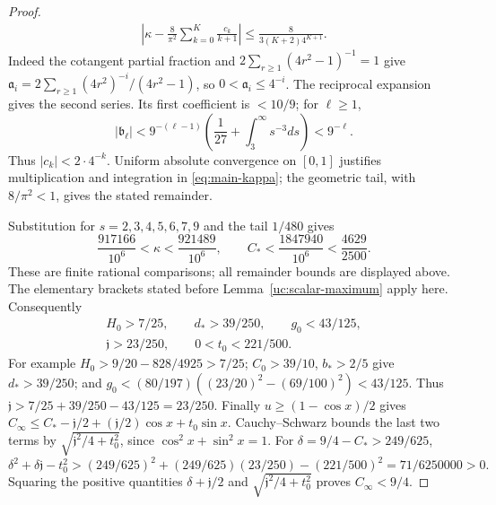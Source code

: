 \begin{proof}
\begin{equation}
\begin{gathered}
 \left|\kappa-\frac8{\pi^2}\sum_{k=0}^K\frac{c_k}{k+1}\right|
       \leq\frac8{3(K+2)4^{K+1}}.
 \end{gathered}
\end{equation}
Indeed the cotangent partial fraction and
$2\sum_{r\geq1}(4r^2-1)^{-1}=1$ give
$\mathfrak a_i=2\sum_{r\geq1}(4r^2)^{-i}/(4r^2-1)$, so
$0<\mathfrak a_i\leq4^{-i}$. The reciprocal expansion gives the
second series. Its first coefficient is $<10/9$; for $\ell\geq1$,
\[
 |\mathfrak b_\ell|<9^{-(\ell-1)}
       \left(\frac1{27}+\int_3^\infty s^{-3}ds\right)<9^{-\ell}.
\]
Thus $|c_k|<2\cdot4^{-k}$. Uniform absolute convergence on $[0,1]$
justifies multiplication and integration in \eqref{eq:main-kappa};
the geometric tail, with $8/\pi^2<1$, gives the stated remainder.

Substitution for $s=2,3,4,5,6,7,9$ and the tail $1/480$ gives
\[
 \frac{917166}{10^6}<\kappa<\frac{921489}{10^6},\qquad
 C_*<\frac{1847940}{10^6}<\frac{4629}{2500}.
\]
These are finite rational comparisons; all remainder bounds are
displayed above. The elementary brackets stated before Lemma~\ref{uc:scalar-maximum} apply here. Consequently
\begin{equation}\label{uc:scalar-constants}
 \begin{gathered}
 H_0>7/25,\qquad d_*>39/250,\qquad g_0<43/125,\\
 \mathfrak j>23/250,\qquad 0<t_0<221/500.
 \end{gathered}
\end{equation}
For example $H_0>9/20-828/4925>7/25$;
$C_0>39/10$, $b_*>2/5$ give $d_*>39/250$;
and $g_0<(80/197)((23/20)^2-(69/100)^2)<43/125$.
Thus $\mathfrak j>7/25+39/250-43/125=23/250$.
Finally $u\geq(1-\cos x)/2$ gives
$C_\infty\leq C_*-\mathfrak j/2+(\mathfrak j/2)\cos x+t_0\sin x$.
Cauchy--Schwarz bounds the last two terms by
$\sqrt{\mathfrak j^2/4+t_0^2}$, since $\cos^2x+\sin^2x=1$.
For $\delta=9/4-C_*>249/625$,
\[
 \delta^2+\delta\mathfrak j-t_0^2>
 (249/625)^2+(249/625)(23/250)-(221/500)^2
 =71/6250000>0.
\]
Squaring the positive quantities $\delta+\mathfrak j/2$ and
$\sqrt{\mathfrak j^2/4+t_0^2}$ proves $C_\infty<9/4$.
\end{proof}


